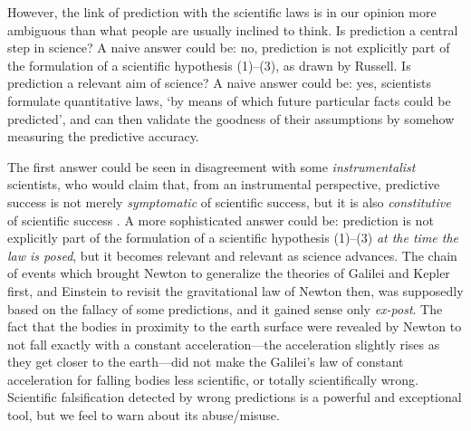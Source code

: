 \documentclass{statsoc}
\begin{document}
However, the link of prediction with the scientific laws is in our opinion more ambiguous than what people are usually inclined to think. Is prediction a central step in science? A naive answer could be: no, prediction is not explicitly part of the formulation of a scientific hypothesis (1)--(3), as drawn by Russell. Is prediction a relevant aim of science? A naive 
answer could be: yes, scientists formulate quantitative laws, `by means of which future particular facts could be
predicted', and can then validate the goodness of their assumptions by somehow  measuring the predictive accuracy. 

The first answer could be seen in disagreement with some 
\emph{instrumentalist} scientists, who would claim that, from an instrumental perspective, predictive success is not merely \emph{symptomatic} of scientific success, but it is also 
\emph{constitutive} of scientific success \citep{hitchcock2004prediction}. A more sophisticated answer could be:  prediction is not explicitly part of the formulation of a 
scientific hypothesis (1)--(3) \emph{at the time the law is posed}, but it becomes relevant and relevant as science advances. The chain of events which brought Newton to 
generalize the theories of Galilei and Kepler first, and Einstein to revisit the gravitational law of Newton then, was supposedly based on the fallacy of some predictions, and it gained sense 
only \emph{ex-post}. The fact that the bodies in proximity to the earth surface were revealed by Newton to not fall exactly with a constant acceleration---the acceleration slightly 
rises as they get closer to the earth---did not make the Galilei's law of constant acceleration for falling bodies less scientific, or totally scientifically wrong. Scientific falsification detected by wrong predictions \citep{popper1934logic} is a powerful and exceptional tool, but we feel to warn about its abuse/misuse. 
\end{document}
